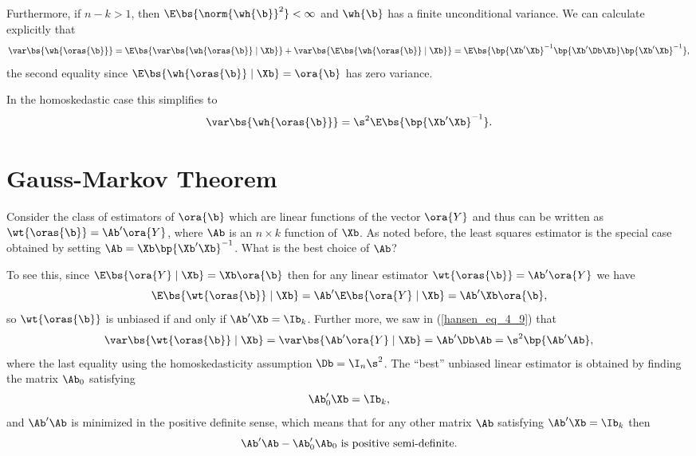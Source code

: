 Furthermore, if $n - k > 1$, then $\E\bs{\norm{\wh{\b}}^2} < \infty$ and $\wh{\b}$ has a finite unconditional variance. We can calculate explicitly that 
\begin{equation}
    \notag
    \var\bs{\wh{\oras{\b}}} = \E\bs{\var\bs{\wh{\oras{\b}} \mid \Xb}} + \var\bs{\E\bs{\wh{\oras{\b}} \mid \Xb}} = \E\bs{\bp{\Xb^\prime \Xb}^{-1} \bp{\Xb^\prime \Db \Xb} \bp{\Xb^\prime \Xb}^{-1}},
\end{equation}
the second equality since $\E\bs{\wh{\oras{\b}} \mid \Xb} = \ora{\b}$ has zero variance. 

In the homoskedastic case this simplifies to 
\begin{equation}
    \notag
    \var\bs{\wh{\oras{\b}}} = \s^2 \E\bs{\bp{\Xb^\prime \Xb}^{-1}}.
\end{equation}


\section{Gauss-Markov Theorem}

Consider the class of estimators of $\ora{\b}$ which are linear functions of the vector $\ora{Y}$ and thus can be written as $\wt{\oras{\b}} = \Ab^\prime \ora{Y}$, where $\Ab$ is an $n \times k$ function of $\Xb$. As noted before, the least squares estimator is the special case obtained by setting $\Ab = \Xb \bp{\Xb^\prime \Xb}^{-1}$. What is the best choice of $\Ab$? 

To see this, since $\E\bs{\ora{Y} \mid \Xb} = \Xb \ora{\b}$ then for any linear estimator $\wt{\oras{\b}} = \Ab^{\prime} \ora{Y}$ we have 
\begin{equation}
    \notag 
    \E\bs{\wt{\oras{\b}} \mid \Xb} = \Ab^{\prime} \E\bs{\ora{Y} \mid \Xb} = \Ab^{\prime} \Xb \ora{\b},
\end{equation}
so $\wt{\oras{\b}}$ is unbiased if and only if $\Ab^{\prime} \Xb = \Ib_k$. Further more, we saw in (\ref{hansen_eq_4_9}) that 
\begin{equation}
    \notag 
    \var\bs{\wt{\oras{\b}} \mid \Xb} = \var\bs{\Ab^{\prime} \ora{Y} \mid \Xb} = \Ab^{\prime} \Db \Ab = \s^2 \bp{\Ab^{\prime} \Ab},
\end{equation}
where the last equality using the homoskedasticity assumption $\Db = \I_n \s^2$. The ``best'' unbiased linear estimator is obtained by finding the matrix $\Ab_0$ satisfying 
$$
\Ab_0^{\prime} \Xb = \Ib_k,
$$
and $\Ab^{\prime} \Ab$ is minimized in the positive definite sense, which means that for any other matrix $\Ab$ satisfying $\Ab^{\prime} \Xb = \Ib_k$ then 
$$
\Ab^{\prime} \Ab - \Ab_0^{\prime} \Ab_0 \text{  is positive semi-definite}.
$$

